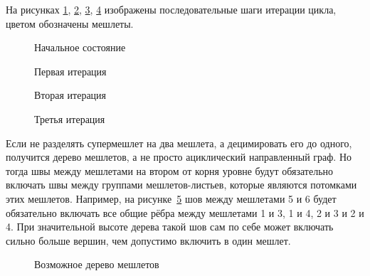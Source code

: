 На рисунках \ref{fig:metis-0}, \ref{fig:metis-1}, \ref{fig:metis-2}, \ref{fig:metis-3} изображены последовательные шаги итерации цикла, цветом обозначены мешлеты.
\begin{figure}[ht]
    \centering
    
    \caption{Начальное состояние}
    \label{fig:metis-0}
\end{figure}
\begin{figure}[ht]
    \centering
    
    \caption{Первая итерация}
    \label{fig:metis-1}
\end{figure}
\begin{figure}[ht]
    \centering
    
    \caption{Вторая итерация}
    \label{fig:metis-2}
\end{figure}
\begin{figure}[ht]
    \centering
    
    \caption{Третья итерация}
    \label{fig:metis-3}
\end{figure}

Если не разделять супермешлет на два мешлета, а децимировать его до одного, получится дерево мешлетов, а не просто ациклический направленный граф.
Но тогда швы между мешлетами на втором от корня уровне будут обязательно включать швы между группами мешлетов-листьев, которые являются потомками этих мешлетов.
Например, на рисунке~\ref{fig:meshlet-tree-example} шов между мешлетами 5 и 6 будет обязательно включать все общие рёбра между мешлетами 1 и 3, 1 и 4, 2 и 3 и 2 и 4.
При значительной высоте дерева такой шов сам по себе может включать сильно больше вершин, чем допустимо включить в один мешлет.
\begin{figure}[ht]
    \centering
    \caption{Возможное дерево мешлетов}
    \label{fig:meshlet-tree-example}
\end{figure}

